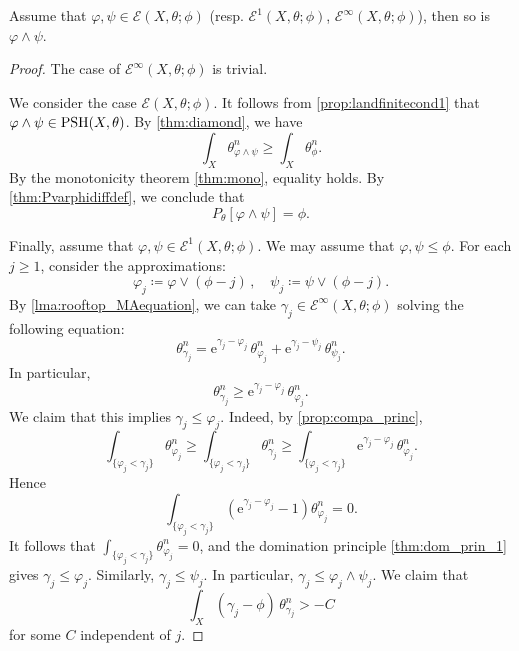 \begin{proposition}\label{prop:relrooftopclosed}
    Assume that $\varphi,\psi\in \mathcal{E}(X,\theta;\phi)$ (resp. $\mathcal{E}^1(X,\theta;\phi)$, $\mathcal{E}^{\infty}(X,\theta;\phi)$), then so is $\varphi\land \psi$.
\end{proposition}
\begin{proof}
    The case of $\mathcal{E}^{\infty}(X,\theta;\phi)$ is trivial.

    We consider the case $\mathcal{E}(X,\theta;\phi)$. It follows from \cref{prop:landfinitecond1} that $\varphi\land \psi\in \mathrm{PSH}(X,\theta)$. By \cref{thm:diamond}, we have
    \[
        \int_X \theta_{\varphi\land\psi}^n\geq \int_X \theta_{\phi}^n.
    \]
    By the monotonicity theorem \cref{thm:mono}, equality holds. By \cref{thm:Pvarphidiffdef}, we conclude that
    \[
        P_{\theta}[\varphi\land \psi]=\phi.
    \]

    Finally, assume that $\varphi,\psi\in \mathcal{E}^1(X,\theta;\phi)$.
    We may assume that $\varphi,\psi\leq \phi$. For each $j\geq 1$, consider the approximations:
	\[
	\varphi_j\coloneqq \varphi\lor(\phi-j)\,,\quad \psi_j\coloneqq \psi\lor(\phi-j).
	\]
	By \cref{lma:rooftop_MAequation}, we can take $\gamma_j\in \mathcal{E}^{\infty}(X,\theta;\phi)$ solving the following equation:
	\[
	\theta_{\gamma_j}^n=\mathrm{e}^{\gamma_j-\varphi_j}\,\theta_{\varphi_j}^n+\mathrm{e}^{\gamma_j-\psi_j}\,\theta_{\psi_j}^n.
	\]
    In particular,
    \[
        \theta_{\gamma_j}^n\geq \mathrm{e}^{\gamma_j-\varphi_j}\,\theta_{\varphi_j}^n.
    \]
   We claim that this implies $\gamma_j\leq \varphi_j$. Indeed, by \cref{prop:compa_princ},
    \[
        \int_{\{\varphi_j<\gamma_j\}}\theta_{\varphi_j}^n
        \geq
        \int_{\{\varphi_j<\gamma_j\}}\theta_{\gamma_j}^n
        \geq
        \int_{\{\varphi_j<\gamma_j\}}\mathrm{e}^{\gamma_j-\varphi_j}\,\theta_{\varphi_j}^n.
    \]
    Hence
    \[
        \int_{\{\varphi_j<\gamma_j\}}\left(\mathrm{e}^{\gamma_j-\varphi_j}-1\right)\theta_{\varphi_j}^n=0.
    \]
    It follows that $\int_{\{\varphi_j<\gamma_j\}}\theta_{\varphi_j}^n=0$, and the domination principle \cref{thm:dom_prin_1} gives $\gamma_j\leq \varphi_j$. Similarly, $\gamma_j\leq \psi_j$. In particular, $\gamma_j\leq \varphi_j\land \psi_j$.
	We claim that
	\begin{equation}\label{eq:intgammajphi_unif_lower}
		\int_X (\gamma_j-\phi)\,\theta_{\gamma_j}^n >-C
	\end{equation}
    for some $C$ independent of $j$.


\end{proof}
